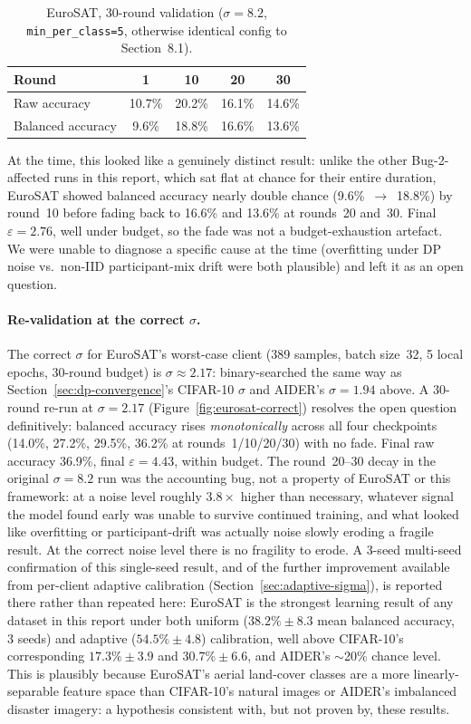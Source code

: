 \documentclass[12pt,a4paper]{article}
\begin{document}
\begin{table}[H]
  \centering
  \caption{EuroSAT, 30-round validation ($\sigma=8.2$, \texttt{min\_per\_class=5},
  otherwise identical config to Section~8.1).}
  \label{tab:eurosat}
  \begin{tabular}{lcccc}
    \toprule
    Round & 1 & 10 & 20 & 30\\
    \midrule
    Raw accuracy & 10.7\% & 20.2\% & 16.1\% & 14.6\%\\
    Balanced accuracy & 9.6\% & 18.8\% & 16.6\% & 13.6\%\\
    \bottomrule
  \end{tabular}
\end{table}

At the time, this looked like a genuinely distinct result: unlike the
other Bug-2-affected runs in this report, which sat flat at chance for
their entire duration, EuroSAT showed balanced accuracy nearly double
chance (9.6\%~$\to$~18.8\%) by round~10 before fading back to 16.6\% and
13.6\% at rounds~20 and~30. Final $\varepsilon=2.76$, well under budget, so
the fade was not a budget-exhaustion artefact. We were unable to diagnose
a specific cause at the time (overfitting under DP noise vs.\ non-IID
participant-mix drift were both plausible) and left it as an open question.

\paragraph{Re-validation at the correct $\sigma$.} The correct $\sigma$ for
EuroSAT's worst-case client (389 samples, batch size~32, 5 local epochs,
30-round budget) is $\sigma\approx2.17$: binary-searched the same way as
Section~\ref{sec:dp-convergence}'s CIFAR-10 $\sigma$ and AIDER's
$\sigma=1.94$ above. A 30-round
re-run at $\sigma=2.17$ (Figure~\ref{fig:eurosat-correct}) resolves the
open question definitively: balanced accuracy rises
\emph{monotonically} across all four checkpoints (14.0\%, 27.2\%,
29.5\%, 36.2\% at rounds~1/10/20/30) with no fade. Final raw accuracy
36.9\%, final $\varepsilon=4.43$, within budget. The round~20--30 decay in
the original $\sigma=8.2$ run was the accounting bug, not a property of
EuroSAT or this framework: at a noise level roughly $3.8\times$ higher
than necessary, whatever signal the model found early was unable to
survive continued training, and what looked like overfitting or
participant-drift was actually noise slowly eroding a fragile result. At
the correct noise level there is no fragility to erode. A 3-seed
multi-seed confirmation of this single-seed result, and of the further
improvement available from per-client adaptive calibration
(Section~\ref{sec:adaptive-sigma}), is reported there rather than
repeated here: EuroSAT is the strongest learning result of any dataset in
this report under both uniform ($38.2\%\pm8.3$ mean balanced accuracy,
3 seeds) and adaptive ($54.5\%\pm4.8$) calibration, well above CIFAR-10's
corresponding $17.3\%\pm3.9$ and $30.7\%\pm6.6$, and AIDER's
$\sim$20\% chance level. This is plausibly because EuroSAT's aerial
land-cover classes are a more linearly-separable feature space than
CIFAR-10's natural images or AIDER's imbalanced disaster imagery: a
hypothesis consistent with, but not proven by, these results.
\end{document}
